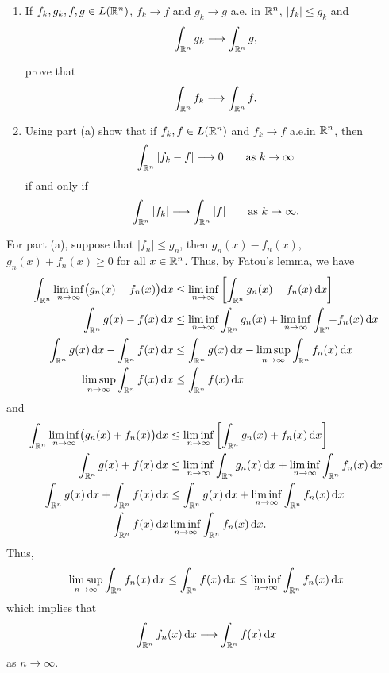 \begin{problem}
\begin{enumerate}[label=(\alph*)]
\item If \(f_k,g_k,f,g\in L(\mathbb{R}^n)\), \(f_k\to f\) and \(g_k\to g\) a.e.\@
  in \(\mathbb{R}^n\), \(|f_k|\leq g_k\) and
  \[
    \int_{\mathbb{R}^n}g_k\longrightarrow\int_{\mathbb{R}^n}g,
  \]

  prove that
  \[
    \int_{\mathbb{R}^n} f_k\longrightarrow\int_{\mathbb{R}^n}f.
  \]
\item Using part (a) show that if \(f_k,f\in L(\mathbb{R}^n)\) and \(f_k\to f\)
  a.e.\@ in \(\mathbb{R}^n\), then
  \[
    \int_{\mathbb{R}^n}|f_k-f|\longrightarrow 0\qquad\text{as \(k\to\infty\)}
  \]
  if and only if
  \[
    \int_{\mathbb{R}^n}|f_k|\longrightarrow\int_{\mathbb{R}^n}|f|\qquad\text{as
      \(k\to\infty\)}.
  \]
\end{enumerate}
\end{problem}
\begin{solution}
  For part (a), suppose that \(|f_n|\leq g_n\), then \(g_n(x)-f_n(x)\),
  \(g_n(x)+f_n(x)\geq 0\) for all \(x\in\mathbb{R}^n\). Thus, by Fatou's lemma,
  we have
  \begin{align*}
    \int_{\bbR^n}\liminf_{n\to\infty}\bigl(g_n(x)-f_n(x)\bigr)\rmd x
    &\leq\liminf_{n\to\infty}\left[\int_{\bbR^n}g_n(x)-f_n(x)\diff x\right]\\
    \int_{\bbR^n}g(x)-f(x)\diff x
    &\leq\liminf_{n\to\infty}\int_{\bbR^n}g_n(x)+\liminf_{n\to\infty}\int_{\mathrlap{\bbR^n}\phantom{-}}-f_n(x)\diff
      x\\
    \int_{\bbR^n}g(x)\diff x-\int_{\bbR^n}f(x)\diff x
    &\leq\int_{\bbR^n}g(x)\diff x-\limsup_{n\to\infty}\int_{\bbR^n}f_n(x)\diff
      x\\
    \limsup_{n\to\infty}\int_{\bbR^n}f(x)\diff x&\leq\int_{\bbR^n}f(x)\diff
                                                  x
  \end{align*}
  and
  \begin{align*}
    \int_{\bbR^n}\liminf_{n\to\infty}\bigl(g_n(x)+f_n(x)\bigr)\rmd x
    &\leq\liminf_{n\to\infty}\left[\int_{\bbR^n}g_n(x)+f_n(x)\diff
      x\right]\\
    \int_{\bbR^n}g(x)+f(x)\diff x
    &\leq\liminf_{n\to\infty}\int_{\bbR^n}g_n(x)\diff x
      +\liminf_{n\to\infty}\int_{\bbR^n}f_n(x)\diff x\\
    \int_{\bbR^n}g(x)\diff x+\int_{\bbR^n}f(x)\diff x
    &\leq\int_{\bbR^n}g(x)\diff
      x+\liminf_{n\to\infty}\int_{\bbR^n}f_n(x)\diff x\\
    \int_{\bbR^n}f(x)\diff x&\liminf_{n\to\infty}\int_{\bbR^n}f_n(x)\diff x.
  \end{align*}
  Thus,
  \[
    \limsup_{n\to\infty}\int_{\mathbb{R}^n}f_n(x)\mathop{}\!\mathrm{d} x\leq
    \int_{\mathbb{R}^n}f(x)\mathop{}\!\mathrm{d} x\leq
    \liminf_{n\to\infty}\int_{\mathbb{R}^n}f_n(x)\mathop{}\!\mathrm{d} x
  \]
  which implies that
  \[
    \int_{\mathbb{R}^n}f_n(x)\mathop{}\!\mathrm{d} x\longrightarrow\int_{\mathbb{R}^n}f(x)\mathop{}\!\mathrm{d} x
  \]
  as \(n\to\infty\).
\end{solution}

